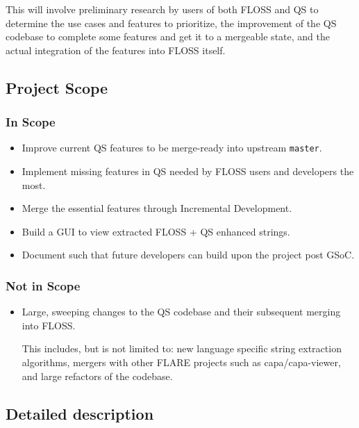 \documentclass[12pt]{article}
\begin{document}
This will involve preliminary research by users of both FLOSS and QS to determine the use cases and features to prioritize, the improvement of the QS codebase to complete some features and get it to a mergeable state, and the actual integration of the features into FLOSS itself.

\subsection*{Project Scope}
{}

\subsubsection*{In Scope}
{}

\begin{itemize}
    \item Improve current QS features to be merge-ready into upstream \texttt{master}.
    \item Implement missing features in QS needed by FLOSS users and developers the most.
    \item Merge the essential features through Incremental Development.
    \item Build a GUI to view extracted FLOSS + QS enhanced strings.
    \item Document such that future developers can build upon the project post GSoC.
\end{itemize}

\subsubsection*{Not in Scope}
{}

\begin{itemize}
    \item Large, sweeping changes to the QS codebase and their subsequent merging into FLOSS.

    This includes, but is not limited to: new language specific string extraction algorithms, mergers with other FLARE projects such as capa/capa-viewer, and large refactors of the codebase.
\end{itemize}

\subsection*{Detailed description}
{}
\end{document}
